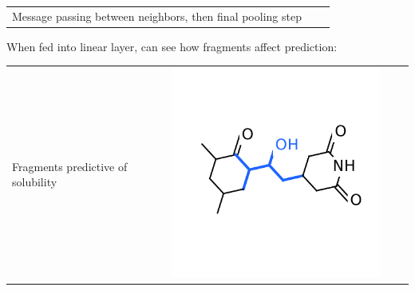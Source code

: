 \documentclass[landscape,a0b,final,a4resizeable]{include/a0poster}
\begin{document}
\begin{poster}
\begin{multicols}{3}
\begin{tabular}{ccc}
\begin{minipage}[c]{0.45\columnwidth}
Message passing between neighbors, then final pooling step

\end{minipage}
\end{tabular}

\vspace{1.5in}


\newcommand{\mywidtha}{8cm}
\newcommand{\mywidthb}{10.3cm}

When fed into linear layer, can see how fragments affect prediction:

\vspace{-0.5in}
\begin{center}
\begin{tabular}{>{\centering}m{\mywidthb} >{\centering}m{\mywidtha} >{\centering}m{\mywidtha} >{\centering\arraybackslash}m{\mywidtha}}
Fragments predictive of solubility & 
\includegraphics[width=\mywidtha, clip, trim = 2mm 3mm 2mm 6mm]{figures/fig_5.pdf} &

\end{tabular}
\end{center}
\end{multicols}
\end{poster}
\end{document}

